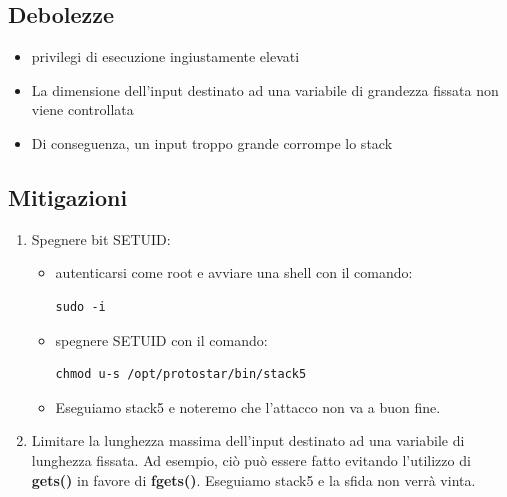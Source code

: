 \subsection{Debolezze}
\begin{itemize}
    \item privilegi di esecuzione ingiustamente elevati
    \item La dimensione dell'input destinato ad una variabile di grandezza fissata non viene controllata
    \item Di conseguenza, un input troppo grande corrompe lo stack
\end{itemize}

\subsection{Mitigazioni}
\begin{enumerate}
    \item Spegnere bit SETUID:
    \begin{itemize}
        \item autenticarsi come root e avviare una shell con il comando: \begin{lstlisting}[style=bashstyle] 
        sudo -i
        \end{lstlisting}
        \item spegnere SETUID con il comando: \begin{lstlisting}[style=bashstyle] 
        chmod u-s /opt/protostar/bin/stack5
        \end{lstlisting}   
        \item Eseguiamo stack5 e noteremo che l'attacco non va a buon fine. 
    \end{itemize}
    \item Limitare la lunghezza massima dell'input destinato ad una variabile di lunghezza fissata. Ad esempio, ciò può essere fatto evitando l'utilizzo di \textbf{gets()} in favore di \textbf{fgets()}.
    Eseguiamo stack5 e la sfida non verrà vinta.
\end{enumerate}
